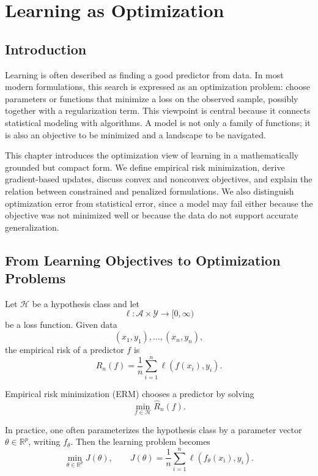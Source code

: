 \chapter{Learning as Optimization}

\section{Introduction}

Learning is often described as finding a good predictor from data. In most modern formulations, this search is expressed as an optimization problem: choose parameters or functions that minimize a loss on the observed sample, possibly together with a regularization term. This viewpoint is central because it connects statistical modeling with algorithms. A model is not only a family of functions; it is also an objective to be minimized and a landscape to be navigated.

This chapter introduces the optimization view of learning in a mathematically grounded but compact form. We define empirical risk minimization, derive gradient-based updates, discuss convex and nonconvex objectives, and explain the relation between constrained and penalized formulations. We also distinguish optimization error from statistical error, since a model may fail either because the objective was not minimized well or because the data do not support accurate generalization.

\section{From Learning Objectives to Optimization Problems}

Let $\mathcal{H}$ be a hypothesis class and let
\[
\ell:\mathcal{A}\times\mathcal{Y}\to[0,\infty)
\]
be a loss function. Given data
\[
(x_1,y_1),\dots,(x_n,y_n),
\]
the empirical risk of a predictor $f$ is
\[
\widehat{R}_n(f)=\frac1n\sum_{i=1}^n \ell(f(x_i),y_i).
\]

\begin{definition}
Empirical risk minimization (ERM) chooses a predictor by solving
\[
\min_{f\in\mathcal{H}} \widehat{R}_n(f).
\]
\end{definition}

In practice, one often parameterizes the hypothesis class by a parameter vector $\theta\in\mathbb{R}^p$, writing $f_\theta$. Then the learning problem becomes
\[
\min_{\theta\in\mathbb{R}^p} J(\theta),
\qquad
J(\theta)=\frac1n\sum_{i=1}^n \ell(f_\theta(x_i),y_i).
\]


